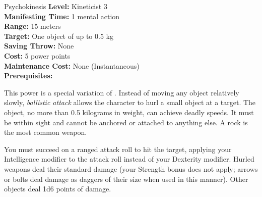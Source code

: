 {Psychokinesis}
{
	\textbf{Level:}
	Kineticist 3\\
	\textbf{Manifesting Time:}
	1 mental action\\
	\textbf{Range:}
	15 meters\\
	\textbf{Target:}
	One object of up to 0.5 kg\\
	\textbf{Saving Throw:}
	None\\
	\textbf{Cost:}
	5 power points\\
	\textbf{Maintenance Cost:}
	None (Instantaneous)\\
	\textbf{Prerequisites:}
	\\
}
{
	This power is a special variation of . Instead of moving any object relatively slowly, \emph{ballistic attack} allows the character to hurl a small object at a target. The object, no more than 0.5 kilograms in weight, can achieve deadly speeds. It must be within sight and cannot be anchored or attached to anything else. A rock is the most common weapon.

	You must succeed on a ranged attack roll to hit the target, applying your Intelligence modifier to the attack roll instead of your Dexterity modifier. Hurled weapons deal their standard damage (your Strength bonus does not apply; arrows or bolts deal damage as daggers of their size when used in this manner). Other objects deal 1d6 points of damage.
}